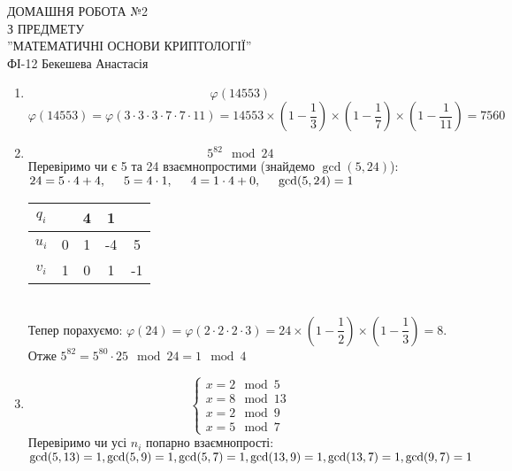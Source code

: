 \documentclass[a4paper,12pt]{article}
\newcommand\tab[1][0.5cm]{\hspace*{#1}}
\begin{document}
	\begin{justify}
		\thispagestyle{empty}\setlength{\parindent}{0pt}
 		\vspace*{\fill}
  		\begin{center}
  			\noindent\makebox[\linewidth]{\rule{\paperwidth}{0.4pt}}
   			\LARGE{\bigbreak ДОМАШНЯ РОБОТА №2\\З ПРЕДМЕТУ\\''МАТЕМАТИЧНІ ОСНОВИ КРИПТОЛОГІЇ''\\\bigbreak} 
   			ФІ-12 Бекешева Анастасія 
   			\noindent\makebox[\linewidth]{\rule{\paperwidth}{0.4pt}}
  		\end{center}
 		\vspace*{\fill}\newpage
 		\begin{enumerate}
 			\item $$\varphi(14553)$$
 			$\varphi(14553) = \varphi(3\cdot3\cdot3\cdot7\cdot7\cdot11)=14553\times\left(1-\dfrac13\right)\times\left(1-\dfrac17\right)\times\left(1-\dfrac1{11}\right)=7560$
 			\item $$5^82\mod 24$$
 				Перевіримо чи є 5 та 24 взаємнопростими (знайдемо $\gcd(5, 24)$):
 				$\\24=5\cdot4+4,\tab 5=4\cdot1,\tab 4=1\cdot4+0,\tab\gcd(5, 24)=1$
\begin{table}[htp]\centering
\begin{tabular}{|c|c|c|c|c|}
\hline
{$q_i$} & {} & {4} & {1} &    \\ \hline
$u_i$          & 0         & 1          & -4         & 5  \\ \hline
$v_i$          & 1         & 0          & 1          & -1 \\ \hline
\end{tabular}
\end{table}
				\\Тепер порахуємо: $\varphi(24)=\varphi(2\cdot2\cdot2\cdot3)=24\times\left(1-\dfrac12\right)\times\left(1-\dfrac13\right)=8.$
				\\Отже $5^{82}=5^{80}\cdot25\mod 24=1\mod4$
 			\item $$\begin{cases}
 				x=2\mod5\\x=8\mod13\\x=2\mod9\\x=5\mod7
 			\end{cases}$$
 			Перевіримо чи усі $n_i$ попарно взаємнопрості:\\
 			$\gcd(5,13)=1,\gcd(5,9)=1,\gcd(5,7)=1,\gcd(13,9)=1,\gcd(13,7)=1,\gcd(9,7)=1\\$

\end{enumerate}
\end{justify}
\end{document}
